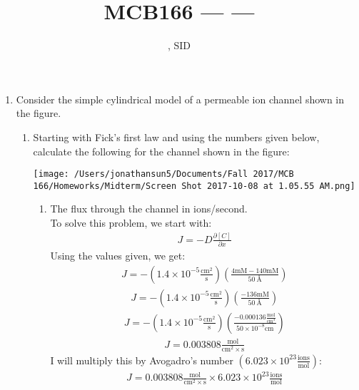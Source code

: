 \documentclass[11pt]{article}
\title{MCB166 --- \Session --- \Homework}
\author{\Name, SID \SID}
\date{\displaydate{date}}
\begin{document}
\maketitle

\newpage
\begin{enumerate}[label=\arabic*.]
\item
Consider the simple cylindrical model of a  permeable ion channel shown in the figure.
\begin{enumerate}[label=\Alph*.]
\item
Starting with Fick’s first law and using the numbers given below, calculate the following for the  channel shown in the figure:
\begin{center}
\texttt{[image: /Users/jonathansun5/Documents/Fall 2017/MCB 166/Homeworks/Midterm/Screen Shot 2017-10-08 at 1.05.55 AM.png]}
\end{center}
\begin{enumerate}[label=\arabic*.]
\item
The flux through the channel in ions/second.
\vspace*{1\baselineskip}
\\
To solve this problem, we start with:
\begin{align*}
J = -D \frac{\partial [C]} {\partial x}
\end{align*}
Using the values given, we get:
\begin{align*}
J = -\left(1.4 \times 10^{-5} \frac{\text{cm} ^ 2} {\text{s}}\right) \left(\frac{4 \text{mM} - 140 \text{mM}} {\SI{50}{\angstrom}}\right)
\end{align*}
\begin{align*}
J = -\left(1.4 \times 10^{-5} \frac{\text{cm} ^ 2} {\text{s}}\right) \left(\frac{- 136 \text{mM}} {\SI{50}{\angstrom}}\right)
\end{align*}
\begin{align*}
J = -\left(1.4 \times 10^{-5} \frac{\text{cm} ^ 2} {\text{s}}\right) \left(\frac{- 0.000136 \frac{\text{mol}} {\text{cm} ^ 3}} {50 \times 10 ^ {-8} \text{cm}}\right)
\end{align*}
\begin{align*}
J = 0.003808 \frac{\text{mol}} {\text{cm} ^ {2} \times \text{s}}
\end{align*}
I will multiply this by Avogadro's number $\left(6.023 \times 10 ^{23} \frac{\text{ions}} {\text{mol}}\right)$:
\begin{align*}
J = 0.003808 \frac{\text{mol}} {\text{cm} ^ {2} \times \text{s}} \times 6.023 \times 10 ^{23} \frac{\text{ions}} {\text{mol}}

\end{align*}
\end{enumerate}
\end{enumerate}
\end{enumerate}
\end{document}
